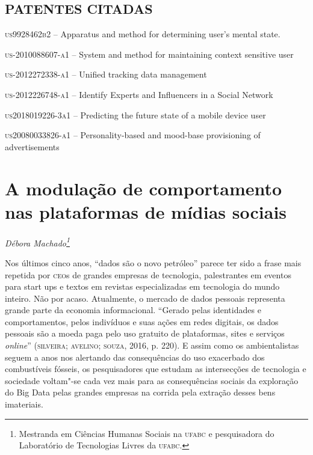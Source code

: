 \section{PATENTES CITADAS}

\begin{Parskip}
\textsc{us9928462b2} -- Apparatus and method for determining user's mental state.

\textsc{us-2010088607-a1} -- System and method for maintaining context sensitive
user

\textsc{us-2012272338-a1} -- Unified tracking data management

\textsc{us-2012226748-a1} -- Identify Experts and Influencers in a Social Network

\textsc{us2018019226-3a1} -- Predicting the future state of a mobile device user

\textsc{us20080033826-a1} -- Personality-based and mood-base provisioning of
advertisements
\end{Parskip}

\chapter*{A modulação de comportamento nas plataformas de mídias sociais}


\begin{flushright}
\emph{Débora Machado\footnote{Mestranda em Ciências Humanas Sociais na \textsc{ufabc} e pesquisadora do Laboratório de Tecnologias Livres da \textsc{ufabc}.}}
\end{flushright}

\noindent{}Nos últimos cinco anos, ``dados são o novo petróleo'' parece ter sido a
frase mais repetida por \textsc{ceo}s de grandes empresas de tecnologia,
palestrantes em eventos para start ups e textos em revistas
especializadas em tecnologia do mundo inteiro. Não por acaso.
Atualmente, o mercado de dados pessoais representa grande parte da
economia informacional. ``Gerado pelas identidades e comportamentos,
pelos indivíduos e suas ações em redes digitais, os dados pessoais são a
moeda paga pelo uso gratuito de plataformas, sites e serviços \emph{online}''
(\textsc{silveira; avelino; souza}, 2016, p. 220). E assim como os ambientalistas
seguem a anos nos alertando das consequências do uso exacerbado dos
combustíveis fósseis, os pesquisadores que estudam as intersecções de
tecnologia e sociedade voltam"-se cada vez mais para as consequências
sociais da exploração do Big Data pelas grandes empresas na corrida pela
extração desses bens imateriais.


